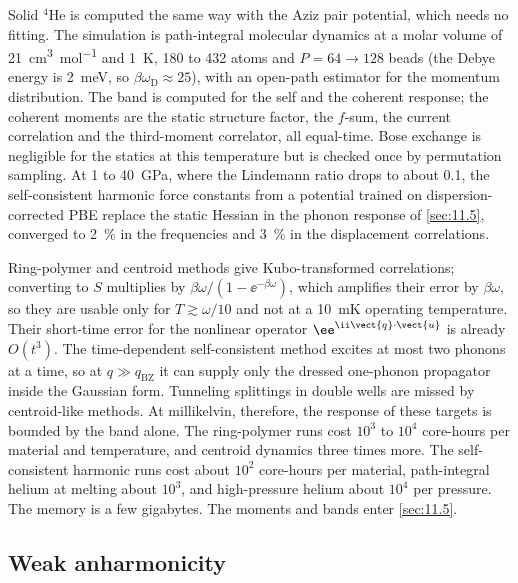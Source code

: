 Solid $^4$He is computed the same way with the Aziz pair potential, which needs no fitting. The simulation is path-integral molecular dynamics at a molar volume of \SI{21}{cm^3.mol^{-1}} and \SI{1}{K}, 180 to 432 atoms and $P = 64\to128$ beads (the Debye energy is \SI{2}{meV}, so $\beta\omega_{\mathrm{D}} \approx 25$), with an open-path estimator for the momentum distribution. The band is computed for the self and the coherent response; the coherent moments are the static structure factor, the $f$-sum, the current correlation and the third-moment correlator, all equal-time. Bose exchange is negligible for the statics at this temperature but is checked once by permutation sampling. At 1 to \SI{40}{GPa}, where the Lindemann ratio drops to about 0.1, the self-consistent harmonic force constants from a potential trained on dispersion-corrected PBE replace the static Hessian in the phonon response of \cref{sec:11.5}, converged to \SI{2}{\percent} in the frequencies and \SI{3}{\percent} in the displacement correlations.

Ring-polymer and centroid methods give Kubo-transformed correlations; converting to $S$ multiplies by $\beta\omega/(1 - \ee^{-\beta\omega})$, which amplifies their error by $\beta\omega$, so they are usable only for $T \gtrsim \omega/10$ and not at a \SI{10}{mK} operating temperature. Their short-time error for the nonlinear operator $\ee^{\ii\vect{q}\cdot\vect{u}}$ is already $O(t^3)$. The time-dependent self-consistent method excites at most two phonons at a time, so at $q \gg q_{\mathrm{BZ}}$ it can supply only the dressed one-phonon propagator inside the Gaussian form. Tunneling splittings in double wells are missed by centroid-like methods. At millikelvin, therefore, the response of these targets is bounded by the band alone. The ring-polymer runs cost $10^3$ to $10^4$ core-hours per material and temperature, and centroid dynamics three times more. The self-consistent harmonic runs cost about $10^2$ core-hours per material, path-integral helium at melting about $10^3$, and high-pressure helium about $10^4$ per pressure. The memory is a few gigabytes. The moments and bands enter \cref{sec:11.5}.

\subsection{Weak anharmonicity}

